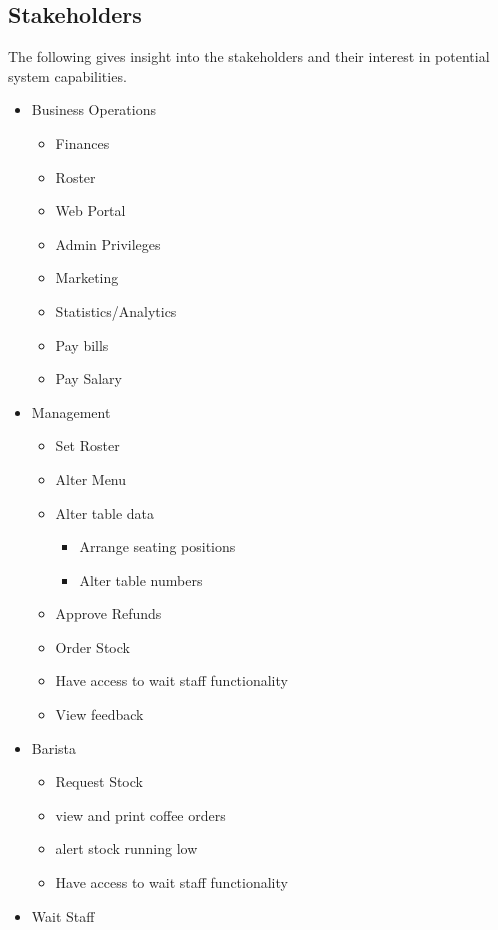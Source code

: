 \documentclass{article}
\begin{document}
\subsection{Stakeholders} 
The following gives insight into the stakeholders and their interest in potential system capabilities.
\begin{itemize}
    \item {Business Operations}
    \begin{itemize}
        \item {Finances}
        \item {Roster}
        \item {Web Portal}
        \item {Admin Privileges}
        \item {Marketing}
        \item {Statistics/Analytics}
        \item Pay bills
        \item Pay Salary
    \end{itemize}
    \item {Management}
    \begin{itemize}
        \item {Set Roster}
        \item {Alter Menu}
        \item {Alter table data}
        \begin{itemize}
            \item {Arrange seating positions}
            \item {Alter table numbers}
        \end{itemize}
        \item {Approve Refunds}
        \item {Order Stock}
        \item {Have access to wait staff functionality}
        \item View feedback
    \end{itemize}
    \item {Barista}
    \begin{itemize}
        \item {Request Stock}
        \item view and print coffee orders
        \item alert stock running low
        \item {Have access to wait staff functionality}
    \end{itemize}
    \item {Wait Staff}

\end{itemize}
\end{document}
